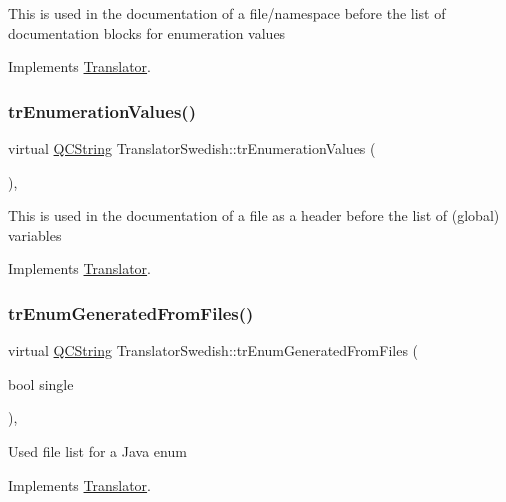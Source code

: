 This is used in the documentation of a file/namespace before the list of documentation blocks for enumeration values 

Implements \mbox{\hyperlink{class_translator}{Translator}}.

\mbox{\label{class_translator_swedish_a8e39aa3ac2772be41b53925329d926c9}} 
\subsubsection{\texorpdfstring{trEnumerationValues()}{trEnumerationValues()}}
{\footnotesize\ttfamily virtual \mbox{\hyperlink{class_q_c_string}{Q\+C\+String}} Translator\+Swedish\+::tr\+Enumeration\+Values (\begin{DoxyParamCaption}{ }\end{DoxyParamCaption})\hspace{0.3cm}{\ttfamily [inline]}, {\ttfamily [virtual]}}

This is used in the documentation of a file as a header before the list of (global) variables 

Implements \mbox{\hyperlink{class_translator}{Translator}}.

\mbox{\label{class_translator_swedish_ad1e1ee3e507e3977e8a25e5996c47320}} 
\subsubsection{\texorpdfstring{trEnumGeneratedFromFiles()}{trEnumGeneratedFromFiles()}}
{\footnotesize\ttfamily virtual \mbox{\hyperlink{class_q_c_string}{Q\+C\+String}} Translator\+Swedish\+::tr\+Enum\+Generated\+From\+Files (\begin{DoxyParamCaption}\item[{bool}]{single }\end{DoxyParamCaption})\hspace{0.3cm}{\ttfamily [inline]}, {\ttfamily [virtual]}}

Used file list for a Java enum 

Implements \mbox{\hyperlink{class_translator}{Translator}}.

